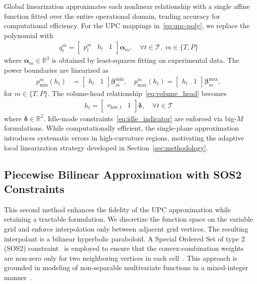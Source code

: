 \documentclass[journal]{IEEEtran}
\begin{document}
Global linearization approximates each nonlinear relationship with a single affine function fitted over the entire operational domain, trading accuracy for computational efficiency. For the UPC mappings in~\eqref{eq:upc-poly}, we replace the polynomial with
\begin{align}
q_t^m = 
\begin{bmatrix} 
p_t^m & h_t & 1 
\end{bmatrix}
\boldsymbol{\alpha}_m,
\quad \forall t \in \mathcal{T},\ m \in \{T,P\}
\label{eq:upc_linear}
\end{align}
where $\boldsymbol{\alpha}_m \in \mathbb{R}^3$ is obtained by least-squares fitting on experimental data. The power boundaries are linearized as
\begin{align}
p_{\min}^m(h_t) &= 
\begin{bmatrix} 
h_t & 1 
\end{bmatrix}
\boldsymbol{\beta}_m^{\min}, 
\quad
p_{\max}^m(h_t) = 
\begin{bmatrix} 
h_t & 1 
\end{bmatrix}
\boldsymbol{\beta}_m^{\max}, \label{eq:pminmax_linear}
\end{align}
for $m \in \{T,P\}$. The volume-head relationship~\eqref{eq:volume_head} becomes
\begin{align}
h_t = 
\begin{bmatrix} 
v_{\text{low},t} & 1 
\end{bmatrix}
\boldsymbol{\delta}, 
\quad \forall t \in \mathcal{T}
\label{eq:vh_linear}
\end{align}
where $\boldsymbol{\delta} \in \mathbb{R}^2$. Idle-mode constraints~\eqref{eq:idle_indicator} are enforced via big-$M$ formulations. While computationally efficient, the single-plane approximation introduces systematic errors in high-curvature regions, motivating the adaptive local linearization strategy developed in Section~\ref{sec:methodology}.

\subsection{Piecewise Bilinear Approximation with SOS2 Constraints}

This second method enhances the fidelity of the UPC approximation while retaining a tractable formulation. We discretize the function space on the variable grid and enforce interpolation only between adjacent grid vertices. The resulting interpolant is a bilinear hyperbolic paraboloid. A Special Ordered Set of type 2 (SOS2) constraint~\cite{beale1970special} is employed to ensure that the convex‑combination weights are non‑zero only for two neighboring vertices in each cell~\cite{beale1976global}. This approach is grounded in modeling of non‑separable multivariate functions in a mixed-integer manner~\cite{huchette2019combinatorial,barmann2023piecewise}.
\end{document}
